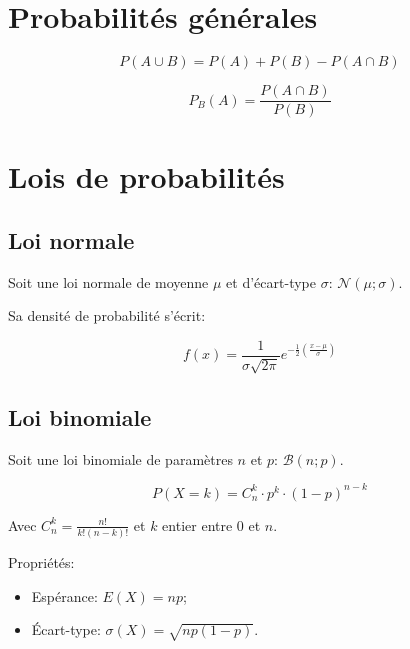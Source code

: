 \section*{Probabilités générales}

\begin{equation*}
 P(A \cup B) = P(A) + P(B) - P(A \cap B)
\end{equation*}

\begin{equation*}
 P_B(A) = \frac{P(A \cap B)}{P(B)}
\end{equation*}


\section*{Lois de probabilités}

\subsection*{Loi normale}
Soit une loi normale de moyenne $\mu$ et d'écart-type $\sigma$: $\mathcal{N}(\mu;\sigma)$.

Sa densité de probabilité s'écrit:

\begin{equation*}
f(x) = \dfrac{1}{\sigma \sqrt{2 \pi}} e^{-\frac{1}{2} \left( \frac{x-\mu}{\sigma} \right)}
\end{equation*}

\subsection*{Loi binomiale}
Soit une loi binomiale de paramètres $n$ et $p$: $\mathcal{B}(n;p)$.

\begin{equation*}
 P(X=k) = C_n^k \cdot p^k \cdot (1-p)^{n-k}
\end{equation*}

Avec $C_n^k = \frac{n!}{k!(n-k)!}$ et $k$ entier entre $0$ et $n$.

Propriétés:
\begin{itemize}
 \item Espérance: $E(X) = np$;
 \item Écart-type: $\sigma(X) = \sqrt{np(1-p)}$.
\end{itemize}


% 
% 
